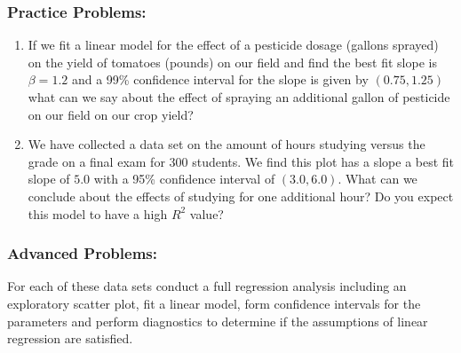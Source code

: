 \documentclass[
]{book}
\providecommand{\tightlist}{%
  \setlength{\itemsep}{0pt}\setlength{\parskip}{0pt}}
\theoremstyle{definition}
\theoremstyle{definition}
\theoremstyle{definition}
\theoremstyle{definition}
\theoremstyle{remark}
\begin{document}
\hypertarget{practice-problems-9}{%
\subsubsection{Practice Problems:}\label{practice-problems-9}}

\begin{enumerate}
\def\labelenumi{\arabic{enumi}.}
\tightlist
\item
  If we fit a linear model for the effect of a pesticide dosage (gallons sprayed) on the yield of tomatoes (pounds) on our field and find the best fit slope is \(\beta=1.2\) and a 99\% confidence interval for the slope is given by \((0.75, 1.25)\) what can we say about the effect of spraying an additional gallon of pesticide on our field on our crop yield?
\item
  We have collected a data set on the amount of hours studying versus the grade on a final exam for 300 students. We find this plot has a slope a best fit slope of \(5.0\) with a 95\% confidence interval of \((3.0,6.0)\). What can we conclude about the effects of studying for one additional hour? Do you expect this model to have a high \(R^2\) value?
\end{enumerate}

\hypertarget{advanced-problems-9}{%
\subsubsection{Advanced Problems:}\label{advanced-problems-9}}

For each of these data sets conduct a full regression analysis including an exploratory scatter plot, fit a linear model, form confidence intervals for the parameters and perform diagnostics to determine if the assumptions of linear regression are satisfied.
\end{document}
